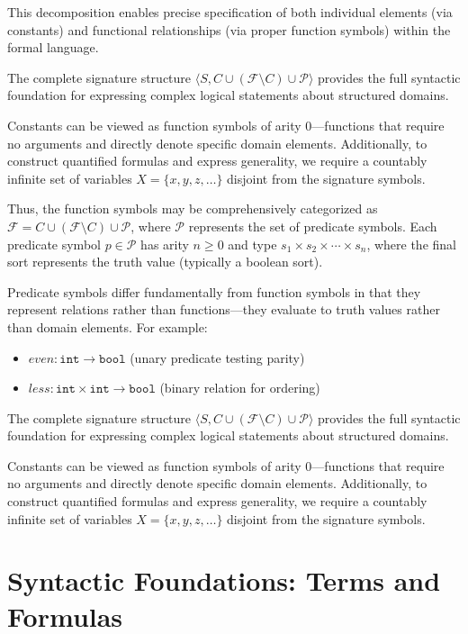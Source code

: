 \documentclass[11pt,a4paper]{article}
\theoremstyle{definition}
\theoremstyle{plain}
\theoremstyle{remark}
\begin{document}
This decomposition enables precise specification of both individual elements (via constants) and functional relationships (via proper function symbols) within the formal language.

The complete signature structure $\langle S, C \cup (\mathcal{F} \setminus C) \cup \mathcal{P} \rangle$ provides the full syntactic foundation for expressing complex logical statements about structured domains.

Constants can be viewed as function symbols of arity 0---functions that require no arguments and directly denote specific domain elements. Additionally, to construct quantified formulas and express generality, we require a countably infinite set of variables $X = \{x, y, z, \dots\}$ disjoint from the signature symbols. 


Thus, the function symbols may be comprehensively categorized as $\mathcal{F} = C \cup (\mathcal{F} \setminus C) \cup \mathcal{P}$, where $\mathcal{P}$ represents the set of predicate symbols. Each predicate symbol $p \in \mathcal{P}$ has arity $n \geq 0$ and type $s_1 \times s_2 \times \cdots \times s_n$, where the final sort represents the truth value (typically a boolean sort).

Predicate symbols differ fundamentally from function symbols in that they represent relations rather than functions---they evaluate to truth values rather than domain elements. For example:
\begin{itemize}
    \item $even : \texttt{int} \rightarrow \texttt{bool}$ (unary predicate testing parity)
    \item $less : \texttt{int} \times \texttt{int} \rightarrow \texttt{bool}$ (binary relation for ordering)
\end{itemize}

The complete signature structure $\langle S, C \cup (\mathcal{F} \setminus C) \cup \mathcal{P} \rangle$ provides the full syntactic foundation for expressing complex logical statements about structured domains.

Constants can be viewed as function symbols of arity 0---functions that require no arguments and directly denote specific domain elements. Additionally, to construct quantified formulas and express generality, we require a countably infinite set of variables $X = \{x, y, z, \dots\}$ disjoint from the signature symbols.

\section{Syntactic Foundations: Terms and Formulas}
\end{document}
